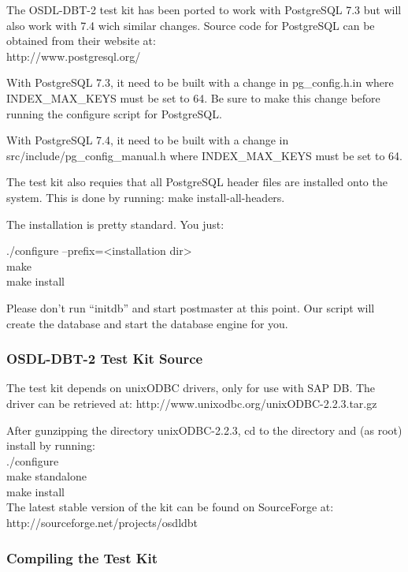 \documentclass{article}
\begin{document}
The OSDL-DBT-2 test kit has been ported to work with PostgreSQL 7.3 but will
also work with 7.4 wich similar changes.  Source code for PostgreSQL can be
obtained from their website at: \\
\indent http://www.postgresql.org/

\noindent
With PostgreSQL 7.3, it need to be built with a change in pg\_config.h.in where
INDEX\_MAX\_KEYS must be set to 64.  Be sure to make this change before running
the configure script for PostgreSQL.

\noindent
With PostgreSQL 7.4, it need to be built with a change in src/include/pg\_config\_manual.h
where INDEX\_MAX\_KEYS must be set to 64.

\noindent
The test kit also requies that all PostgreSQL header files are installed onto
the system.  This is done by running: make install-all-headers.

\noindent
The installation is pretty standard. You just:

\indent ./configure --prefix=<installation dir> \\
\indent make \\
\indent make install

\noindent
Please don't run ``initdb'' and start postmaster at this point. Our script will
create the database and start the database engine for you.

\subsubsection{OSDL-DBT-2 Test Kit Source}

\noindent
The test kit depends on unixODBC drivers, only for use with SAP DB.  The driver
can be retrieved at: http://www.unixodbc.org/unixODBC-2.2.3.tar.gz

\noindent
After gunzipping the directory unixODBC-2.2.3, cd to the directory and (as
root) install by running: \\
\indent ./configure \\
\indent make standalone \\
\indent make install \\

\noindent
The latest stable version of the kit can be found on SourceForge at: \\
\indent http://sourceforge.net/projects/osdldbt

\subsubsection{Compiling the Test Kit}
\end{document}
